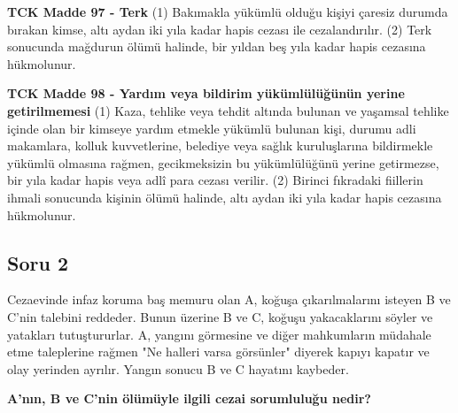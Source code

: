 \documentclass[a4paper, 11pt, twocolumn]{article}
\newenvironment{lawbox}{%
    \par\noindent
    \begin{tcolorbox}[
        colback=lawbg,
        colframe=boxcolor,
        fonttitle=\bfseries,
        boxrule=0.5pt,
        left=3pt,
        right=3pt,
        top=3pt,
        bottom=3pt,
        width=\columnwidth,
        arc=2pt,
        before skip=0.2cm,
        after skip=0.2cm
    ]
    \footnotesize\itshape
}{\end{tcolorbox}}
\begin{document}
\begin{lawbox}
\textbf{TCK Madde 97 - Terk}
\newline
(1) Bakımakla yükümlü olduğu kişiyi çaresiz durumda bırakan kimse, altı aydan iki yıla kadar hapis cezası ile cezalandırılır.
\newline
(2) Terk sonucunda mağdurun ölümü halinde, bir yıldan beş yıla kadar hapis cezasına hükmolunur.
\end{lawbox}
\begin{lawbox}
\textbf{TCK Madde 98 - Yardım veya bildirim yükümlülüğünün yerine getirilmemesi}
\newline
(1) Kaza, tehlike veya tehdit altında bulunan ve yaşamsal tehlike içinde olan bir kimseye yardım etmekle yükümlü bulunan kişi, durumu adli makamlara, kolluk kuvvetlerine, belediye veya sağlık kuruluşlarına bildirmekle yükümlü olmasına rağmen, gecikmeksizin bu yükümlülüğünü yerine getirmezse, bir yıla kadar hapis veya adlî para cezası verilir.
\newline
(2) Birinci fıkradaki fiillerin ihmali sonucunda kişinin ölümü halinde, altı aydan iki yıla kadar hapis cezasına hükmolunur.
\end{lawbox}


\subsection*{Soru 2}
Cezaevinde infaz koruma baş memuru olan A, koğuşa çıkarılmalarını isteyen B ve C'nin talebini reddeder. Bunun üzerine B ve C, koğuşu yakacaklarını söyler ve yatakları tutuştururlar. A, yangını görmesine ve diğer mahkumların müdahale etme taleplerine rağmen "Ne halleri varsa görsünler" diyerek kapıyı kapatır ve olay yerinden ayrılır. Yangın sonucu B ve C hayatını kaybeder.

\textbf{A'nın, B ve C'nin ölümüyle ilgili cezai sorumluluğu nedir?}
\end{document}
